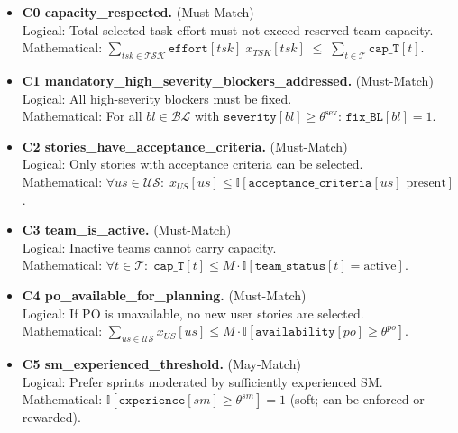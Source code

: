 \documentclass[11pt,a4paper]{article}
\begin{document}
\begin{itemize}[leftmargin=2em]
  \item \textbf{C0 \; capacity\_respected.} (Must-Match)\\
  Logical: Total selected task effort must not exceed reserved team capacity.\\
  Mathematical:\; $\displaystyle \sum_{tsk \in \mathcal{TSK}} \texttt{effort}[tsk]\; x_{TSK}[tsk] \;\le\; \sum_{t \in \mathcal{T}} \texttt{cap\_T}[t]$.

  \item \textbf{C1 \; mandatory\_high\_severity\_blockers\_addressed.} (Must-Match)\\
  Logical: All high-severity blockers must be fixed.\\
  Mathematical:\; For all $bl \in \mathcal{BL}$ with $\texttt{severity}[bl] \ge \theta^{\text{sev}}$: $\texttt{fix\_BL}[bl] = 1$.

  \item \textbf{C2 \; stories\_have\_acceptance\_criteria.} (Must-Match)\\
  Logical: Only stories with acceptance criteria can be selected.\\
  Mathematical:\; $\forall us \in \mathcal{US}: \; x_{US}[us] \le \mathbb{I}[\texttt{acceptance\_criteria}[us]\text{ present}]$.

  \item \textbf{C3 \; team\_is\_active.} (Must-Match)\\
  Logical: Inactive teams cannot carry capacity.\\
  Mathematical:\; $\forall t \in \mathcal{T}:\; \texttt{cap\_T}[t] \le M \cdot \mathbb{I}[\texttt{team\_status}[t]=\text{active}]$.

  \item \textbf{C4 \; po\_available\_for\_planning.} (Must-Match)\\
  Logical: If PO is unavailable, no new user stories are selected.\\
  Mathematical:\; $\sum_{us \in \mathcal{US}} x_{US}[us] \le M \cdot \mathbb{I}[\texttt{availability}[po]\ge \theta^{po}]$.

  \item \textbf{C5 \; sm\_experienced\_threshold.} (May-Match)\\
  Logical: Prefer sprints moderated by sufficiently experienced SM.\\
  Mathematical:\; $\mathbb{I}[\texttt{experience}[sm] \ge \theta^{sm}] = 1$ (soft; can be enforced or rewarded).


\end{itemize}
\end{document}
